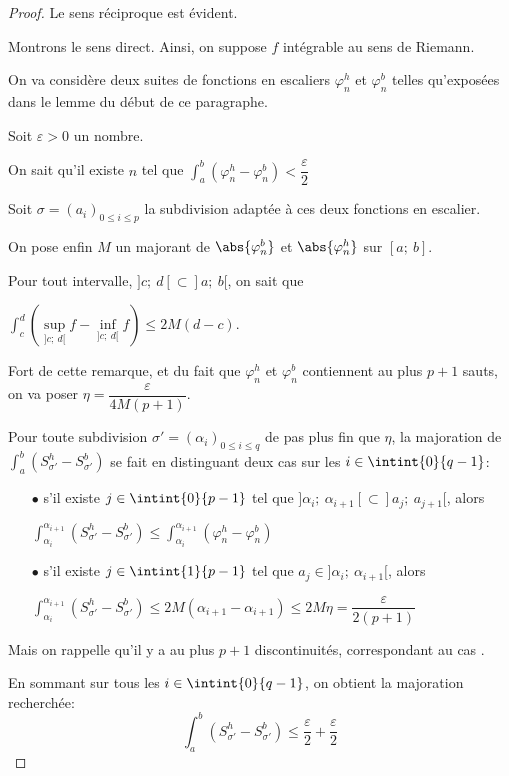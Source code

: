 \begin{proof}
Le sens réciproque est évident.

Montrons le sens direct. Ainsi, on suppose $f$ intégrable au sens de Riemann.

On va considère deux suites de fonctions en escaliers $\varphi_n^h$ et $\varphi_n^b$ telles qu'exposées dans le lemme du début de ce paragraphe.

Soit $\varepsilon > 0$ un nombre.

On sait qu'il existe $n$ tel que $\displaystyle{\int_a^b} \left(\varphi_n^h-\varphi_n^b\right) < \dfrac{\varepsilon}{2}$

Soit $\sigma=(a_i)_{0 \leq i \leq p}$ la subdivision adaptée à ces deux fonctions en escalier.

On pose enfin $M$ un majorant de $\abs{\varphi_n^b}$ et $\abs{\varphi_n^h}$ sur $[a;~b]$.

Pour tout intervalle, $]c;~d[ \subset ]a;~b[$, on sait que  

$\displaystyle{\int_c^d} \left(\sup \limits_{]c;~d[} f -\inf \limits_{]c;~d[} f\right) \leq 2M(d-c)$.

Fort de cette remarque, et du fait que $\varphi_n^h$ et $\varphi_n^b$ contiennent au plus $p+1$ sauts, on va poser $\eta = \dfrac{\varepsilon}{4M(p+1)}$.

Pour toute subdivision $\sigma'=(\alpha_i)_{0 \leq i \leq q}$ de pas plus fin que $\eta$, la majoration de 
$
\displaystyle{\int_a^b} \left(S_{\sigma'}^h - S_{\sigma'}^b\right)
$ se fait en distinguant deux cas sur les $i \in \intint{0}{q-1}$:
\begin{itemize}
\item[$\bullet$] s'il existe $j \in \intint{0}{p-1}$ tel que $]\alpha_i;~\alpha_{i+1}[ \subset ]a_j;~a_{j+1}[$, alors

$\displaystyle{\int_{\alpha_i}^{\alpha_{i+1}}} \left(S_{\sigma'}^h - S_{\sigma'}^b\right) \leq \displaystyle{\int_{\alpha_i}^{\alpha_{i+1}}} \left(\varphi_n^h-\varphi_n^b\right)$

\item[$\bullet$] s'il existe $j \in \intint{1}{p-1}$ tel que $a_j \in ]\alpha_i;~\alpha_{i+1}[$, alors

$\displaystyle{\int_{\alpha_i}^{\alpha_{i+1}}} \left(S_{\sigma'}^h - S_{\sigma'}^b\right) \leq 2 M \left(\alpha_{i+1}-\alpha_{i+1}\right) \leq 2M \eta  = \dfrac{\varepsilon}{2(p+1)}$ 
\end{itemize}

Mais on rappelle qu'il y a au plus $p+1$ discontinuités, correspondant au cas .

En sommant sur tous les $i \in \intint{0}{q-1}$, on obtient la majoration recherchée:
\[
\displaystyle{\int_a^b} \left(S_{\sigma'}^h - S_{\sigma'}^b\right) \leq \dfrac{\varepsilon}{2} + \dfrac{\varepsilon}{2}
\]
\end{proof}

